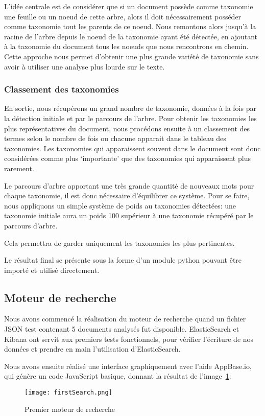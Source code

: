 L'idée centrale est de considérer que si un document possède comme taxonomie une feuille ou un noeud de cette arbre, alors il doit nécessairement posséder comme taxonomie tout les parents de ce noeud. 
Nous remontons alors jusqu'à la racine de l'arbre depuis le noeud de la taxonomie ayant été détectée, en ajoutant à la taxonomie du document tous les noeuds que nous rencontrons en chemin.
Cette approche nous permet d'obtenir une plus grande variété de taxonomie sans avoir à utiliser une analyse plus lourde sur le texte. 


\subsubsection{Classement des taxonomies}
En sortie, nous récupérons un grand nombre de taxonomie, données à la fois par la détection initiale et par le parcours de l'arbre.
Pour obtenir les taxonomies les plus représentatives du document, nous procédons ensuite à un classement des termes selon le nombre de fois ou chacune apparait dans le tableau des taxonomies.
Les taxonomies qui apparaissent souvent dans le document sont donc considérées comme plus `importante' que des taxonomies qui apparaissent plus rarement.

Le parcours d'arbre apportant une très grande quantité de nouveaux mots pour chaque taxonomie, il est donc nécessaire d'équilibrer ce système.
Pour se faire, nous appliquons un simple système de poids au taxonomies détectées: une taxonomie initiale aura un poids 100 supérieur à une taxonomie récupéré par le parcours d'arbre.

Cela permettra de garder uniquement les taxonomies les plus pertinentes.




Le résultat final se présente sous la forme d'un module python pouvant être importé et utilisé directement.



\subsection{Moteur de recherche}
Nous avons commencé la réalisation du moteur de recherche quand un fichier JSON test contenant 5 documents analysés fut disponible.
ElasticSearch et Kibana ont servit aux premiers tests fonctionnels, pour vérifier l'écriture de nos données et prendre en main l'utilisation d'ElasticSearch.

Nous avons ensuite réalisé une interface graphiquement avec l'aide AppBase.io, qui génère un code JavaScript basique, donnant la résultat de l'image~\ref{fig:firstSearch}:
\begin{figure}[h!]
  \centering
  \texttt{[image: firstSearch.png]}
	\caption[]{Premier moteur de recherche}
	\label{fig:firstSearch}
\end{figure}

